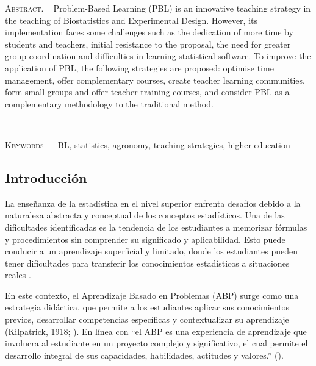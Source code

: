 \vspace{1em}

\begin{center}
	\begin{minipage}{0.75\linewidth} \small
		\textsc{Abstract}. ~
		Problem-Based Learning (PBL) is an innovative teaching strategy in the teaching of Biostatistics and Experimental Design. However, its implementation faces some challenges such as the dedication of more time by students and teachers, initial resistance to the proposal, the need for greater group coordination and difficulties in learning statistical software. To improve the application of PBL, the following strategies are proposed: optimise time management, offer complementary courses, create teacher learning communities, form small groups and offer teacher training courses, and consider PBL as a complementary methodology to the traditional method.
	\end{minipage}\\
	
	\vspace{0.5em}
	
	\begin{minipage}{0.75\linewidth} \small
	\textsc{Keywords} --- BL, statistics, agronomy, teaching strategies, higher education
	\end{minipage}
\end{center}

\subsection{Introducción}

La enseñanza de la estadística en el nivel superior enfrenta desafíos debido a la naturaleza abstracta y conceptual de los conceptos estadísticos. Una de las dificultades identificadas es la tendencia de los estudiantes a memorizar fórmulas y procedimientos sin comprender su significado y aplicabilidad. Esto puede conducir a un aprendizaje superficial y limitado, donde los estudiantes pueden tener dificultades para transferir los conocimientos estadísticos a situaciones reales \textcite{batanero2001}.

En este contexto, el Aprendizaje Basado en Problemas (ABP) surge como una estrategia didáctica, que permite a los estudiantes aplicar sus conocimientos previos, desarrollar competencias específicas y contextualizar su aprendizaje (Kilpatrick, 1918; \textcite{fernandez2013}). En línea con \textcite{vargas2020} “el ABP es una experiencia de aprendizaje que involucra al estudiante en un proyecto complejo y significativo, el cual permite el desarrollo integral de sus capacidades, habilidades, actitudes y valores.” (\textcite[p.~170]{vargas2020}).

